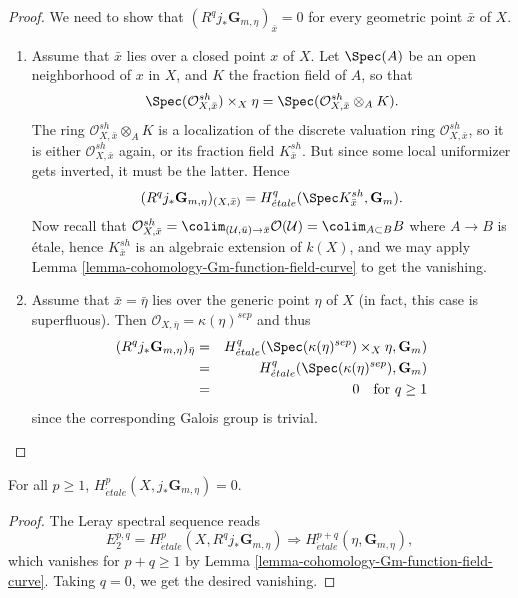 \begin{proof}
We need to show that $(R^q j_*\mathbf{G}_{m, \eta})_{\bar x} = 0$ for every
geometric point $\bar x$ of $X$.
\begin{enumerate}
\item
Assume that $\bar x$ lies over a closed point $x$ of $X$. Let $\Spec(A)$
be an open neighborhood of $x$ in $X$, and $K$ the fraction field of $A$, so
that
$$
\Spec(\mathcal{O}^{sh}_{X, \bar x}) \times_X \eta =
\Spec(\mathcal{O}^{sh}_{X, \bar x} \otimes_A K).
$$
The ring $\mathcal{O}^{sh}_{X, \bar x} \otimes_A K$ is a localization of
the discrete valuation ring $\mathcal{O}^{sh}_{X, \bar x}$, so it is either
$\mathcal{O}^{sh}_{X, \bar x}$ again, or its fraction field
$K^{sh}_{\bar x}$. But since some local uniformizer gets inverted, it must
be the latter. Hence
$$
(R^q j_*\mathbf{G}_{m, \eta})_{(X, \bar x)} = H_{\acute{e}tale}^q(\Spec
K^{sh}_{\bar x}, \mathbf{G}_m).
$$
Now recall that $\mathcal{O}^{sh}_{X, \bar x} =
\colim_{(\mathcal{U}, \bar u) \to \bar x} \mathcal{O} (\mathcal{U}) =
\colim_{A \subset B} B$ where $A \to B$ is \'etale, hence
$K^{sh}_{\bar x}$ is an algebraic extension of $k(X)$, and we may apply
Lemma \ref{lemma-cohomology-Gm-function-field-curve}
to get the vanishing.
\item
Assume that $\bar x = \bar \eta$ lies over the generic point $\eta$ of $X$ (in
fact, this case is superfluous). Then $\mathcal{O}_{X, \bar \eta} =
\kappa(\eta)^{sep}$ and thus
\begin{eqnarray*}
(R^q j_*\mathbf{G}_{m, \eta})_{\bar \eta}
& = &
H_{\acute{e}tale}^q(\Spec(\kappa(\eta)^{sep}) \times_X \eta, \mathbf{G}_m) \\
& = & H_{\acute{e}tale}^q (\Spec(\kappa(\eta)^{sep}), \mathbf{G}_m) \\
& = & 0 \ \ \text{ for } q \geq 1
\end{eqnarray*}
since the corresponding Galois group is trivial.
\end{enumerate}
\end{proof}

\begin{lemma}
\label{lemma-cohomology-jstar-Gm}
For all $p \geq 1$, $H_{\acute{e}tale}^p(X, j_*\mathbf{G}_{m, \eta}) = 0$.
\end{lemma}

\begin{proof}
The Leray spectral sequence reads
$$
E_2^{p, q} = H_{\acute{e}tale}^p(X, R^qj_*\mathbf{G}_{m, \eta}) \Rightarrow
H_{\acute{e}tale}^{p+q}(\eta, \mathbf{G}_{m, \eta}),
$$
which vanishes for $p+q \geq 1$ by
Lemma \ref{lemma-cohomology-Gm-function-field-curve}. Taking
$q = 0$, we get the desired vanishing.
\end{proof}

